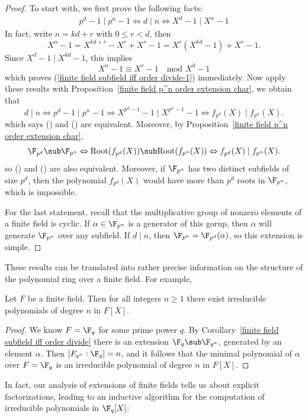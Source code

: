 \begin{proof}
To start with, we first prove the following facts:
\begin{align}\label{finite field subfield iff order divide-1}
p^d-1\mid p^n-1\Leftrightarrow d\mid n\Leftrightarrow X^d-1\mid X^n-1
\end{align}
In fact, write $n=kd+r$ with $0\leq r<d$, then
\[X^{n}-1=X^{kd+r}-X^r+X^r-1=X^r(X^{kd}-1)+X^r-1.\]
Since $X^d-1\mid X^{kd}-1$, this implies
\[X^n-1\equiv X^r-1\quad \text{mod $X^d-1$}\]
which proves (\ref{finite field subfield iff order divide-1}) immediately. Now apply these results with Proposition~\ref{finite field p^n order extension char}, we obtain that
\[d\mid n\Leftrightarrow p^d-1\mid p^n-1\Leftrightarrow X^{p^d-1}-1\mid X^{p^n-1}-1\Leftrightarrow f_{p^d}(X)\mid f_{p^n}(X).\]
which says () and () are equivalent. Moreover, by Proposition~\ref{finite field p^n order extension char},
\[\F_{p^d}\sub\F_{p^n}\Leftrightarrow\text{Root}(f_{p^d}(X))\sub\text{Root}(f_{p^n}(X))\Leftrightarrow f_{p^d}(X)\mid f_{p^n}(X).\]
so () and () are also equivalent. Moreover, if $\F_{p^n}$ has two distinct subfields of size $p^d$, then the polynomial $f_{p^d}(X)$ would have more than $p^d$ roots in $\F_{p^n}$, which is impossible.\par
For the last statement, recall that the multiplicative group of nonzero elements of a finite field is cyclic. If $\alpha\in\F_{p^n}$ is a generator of this gorup, then $\alpha$ will generate $\F_{p^n}$ over any subfield. If $d\mid n$, then $\F_{p^n}=\F_{p^d}(\alpha)$, so this extension is simple.
\end{proof}
These results can be translated into rather precise information on the structure of the polynomial ring over a finite field. For example,
\begin{corollary}\label{finite field irre poly of any order}
Let $F$ be a finite field. Then for all integers $n\geq1$ there exist irreducible polynomials of degree $n$ in $F[X]$.
\end{corollary}
\begin{proof}
We know $F=\F_{q}$ for some prime power $q$. By Corollary~\ref{finite field subfield iff order divide} there is an extension $\F_{q}\sub\F_{q^{n}}$, generated by an element $\alpha$. Then $[F_{q^{n}}:\F_{q}]=n$, and it follows that the minimal polynomial of $\alpha$ over $F=\F_{q}$ is an irreducible polynomial of degree $n$ in $F[X]$.
\end{proof}
In fact, our analysis of extensions of finite fields tells us about explicit factorizations, leading to an inductive algorithm for the computation of irreducible polynomials in $\F_q[X]$:
